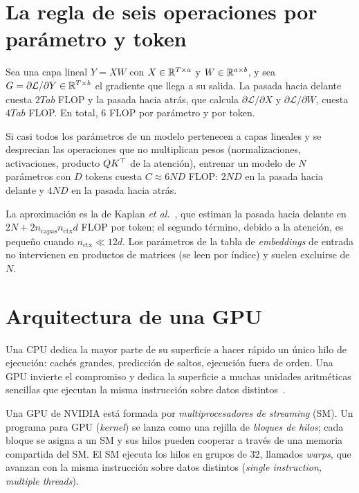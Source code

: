 \addtocounter{definicion}{1}%

\section{La regla de seis operaciones por parámetro y token}

\begin{proposicion}\label{prop:6nd-capa}
Sea una capa lineal $Y=XW$ con $X\in\mathbb{R}^{T\times a}$ y $W\in\mathbb{R}^{a\times b}$, y sea $G=\partial\mathcal{L}/\partial Y\in\mathbb{R}^{T\times b}$ el gradiente que llega a su salida. La pasada hacia delante cuesta $2Tab$ FLOP y la pasada hacia atrás, que calcula $\partial\mathcal{L}/\partial X$ y $\partial\mathcal{L}/\partial W$, cuesta $4Tab$ FLOP. En total, $6$ FLOP por parámetro y por token.
\end{proposicion}

\begin{corolario}\label{cor:6nd}
Si casi todos los parámetros de un modelo pertenecen a capas lineales y se desprecian las operaciones que no multiplican pesos (normalizaciones, activaciones, producto $QK^{\top}$ de la atención), entrenar un modelo de $N$ parámetros con $D$ tokens cuesta $C\approx 6ND$ FLOP: $2ND$ en la pasada hacia delante y $4ND$ en la pasada hacia atrás.
\end{corolario}

La aproximación es la de Kaplan \emph{et al.}~\cite[§2.1 y tabla~1]{kaplan}, que estiman la pasada hacia delante en $2N+2n_{\mathrm{capas}}n_{\mathrm{ctx}}d$ FLOP por token; el segundo término, debido a la atención, es pequeño cuando $n_{\mathrm{ctx}}\ll 12d$. Los parámetros de la tabla de \emph{embeddings} de entrada no intervienen en productos de matrices (se leen por índice) y suelen excluirse de $N$.

\section{Arquitectura de una GPU}

Una CPU dedica la mayor parte de su superficie a hacer rápido un único hilo de ejecución: cachés grandes, predicción de saltos, ejecución fuera de orden. Una GPU invierte el compromiso y dedica la superficie a muchas unidades aritméticas sencillas que ejecutan la misma instrucción sobre datos distintos~\cite[cap.~4]{hp}.

\begin{definicion}
Una GPU de NVIDIA está formada por \emph{multiprocesadores de streaming} (SM). Un programa para GPU (\emph{kernel}) se lanza como una rejilla de \emph{bloques de hilos}; cada bloque se asigna a un SM y sus hilos pueden cooperar a través de una memoria compartida del SM. El SM ejecuta los hilos en grupos de 32, llamados \emph{warps}, que avanzan con la misma instrucción sobre datos distintos (\emph{single instruction, multiple threads}).
\end{definicion}

